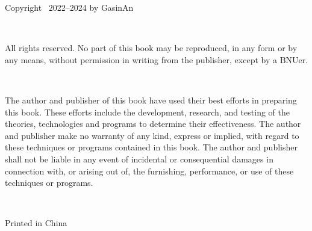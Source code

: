 \noindent Copyright \textcopyright~2022--2024 by GasinAn

\ 

\noindent All rights reserved. No part of this book may be reproduced, 
in any form or by any means, without permission in writing from the publisher, except by a BNUer.

\ 

\noindent The author and publisher of this book have used their best efforts
in preparing this book. These efforts include the development, research, and testing of the theories,
technologies and programs to determine their effectiveness.
The author and publisher make no warranty of any kind, express or implied,
with regard to these techniques or programs contained in this book.
The author and publisher shall not be liable in any event of incidental or consequential damages
in connection with, or arising out of, the furnishing, performance, or use of these techniques or programs.

\ 

\noindent Printed in China
